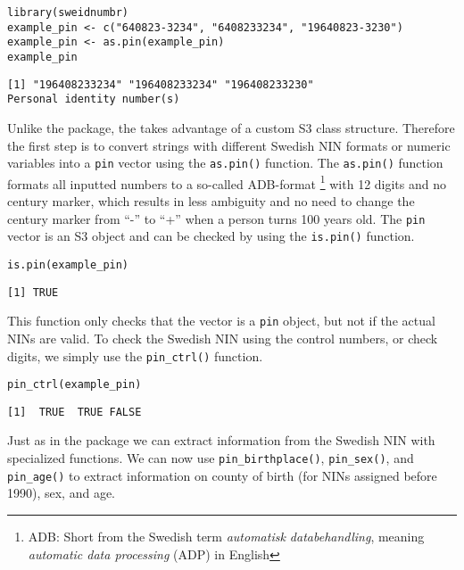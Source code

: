 \begin{verbatim}
library(sweidnumbr)
example_pin <- c("640823-3234", "6408233234", "19640823-3230")
example_pin <- as.pin(example_pin)
example_pin
\end{verbatim}

\begin{verbatim}
[1] "196408233234" "196408233234" "196408233230"
Personal identity number(s)
\end{verbatim}

Unlike the  package, the  takes advantage of a custom S3 class structure. Therefore the first step is to convert strings with different Swedish NIN formats or numeric variables into a \texttt{pin} vector using the \texttt{as.pin()} function. The \texttt{as.pin()} function formats all inputted numbers to a so-called ADB-format \footnote{ADB: Short from the Swedish term \emph{automatisk databehandling}, meaning \emph{automatic data processing} (ADP) in English} with 12 digits and no century marker, which results in less ambiguity and no need to change the century marker from ``-'' to ``+'' when a person turns 100 years old. The \texttt{pin} vector is an S3 object and can be checked by using the \texttt{is.pin()} function.

\begin{verbatim}
is.pin(example_pin)
\end{verbatim}

\begin{verbatim}
[1] TRUE
\end{verbatim}

This function only checks that the vector is a \texttt{pin} object, but not if the actual NINs are valid. To check the Swedish NIN using the control numbers, or check digits, we simply use the \texttt{pin\_ctrl()} function.

\begin{verbatim}
pin_ctrl(example_pin)
\end{verbatim}

\begin{verbatim}
[1]  TRUE  TRUE FALSE
\end{verbatim}

Just as in the  package we can extract information from the Swedish NIN with specialized functions. We can now use \texttt{pin\_birthplace()}, \texttt{pin\_sex()}, and \texttt{pin\_age()} to extract information on county of birth (for NINs assigned before 1990), sex, and age.

